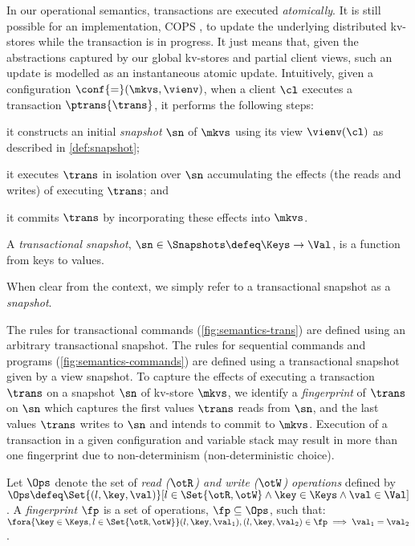 In our operational semantics, transactions are executed
\emph{atomically}. It is still possible for an
implementation, \eg COPS \cite{cops}, 
to update the underlying distributed kv-stores while
the transaction is in progress. It just means that, given the
abstractions captured by our global kv-stores and partial client views, 
such an update is modelled as an instantaneous  atomic
update.
Intuitively, given a configuration \(\conf {=} (\mkvs, \vienv)\), 
when a client \(\cl\) executes a transaction \(\ptrans{\trans}\), 
it performs the following steps: 
\begin{enumerate*}
	\item it constructs an initial \emph{snapshot} \(\sn\) of \(\mkvs\) using its view \(\vienv(\cl)\) as described in \cref{def:snapshot};  
	\item it executes \(\trans\) in isolation over \(\sn\) accumulating the effects (the reads and writes) of executing \(\trans\); and
	\item it commits \(\trans\) by incorporating these effects into \(\mkvs\).
\end{enumerate*}

\SpaceAboveDef
\begin{definition}
\label{def:heaps}
A \emph{transactional snapshot}, \( \sn \in \Snapshots \defeq \Keys \to
\Val\),  is a function from keys to values. 
\end{definition}
\SpaceBelowDef
When clear from the context, we simply refer to a transactional
snapshot  as a {\em snapshot}. 

The rules for transactional commands (\cref{fig:semantics-trans}) are defined using an arbitrary 
transactional snapshot. 
The rules for sequential commands and programs (\cref{fig:semantics-commands}) are defined using a transactional
snapshot given by a view snapshot. 
To capture the effects of executing a transaction \(\trans\) on a snapshot \(\sn\) of kv-store \(\mkvs\), 
we identify a \emph{fingerprint} of \(\trans\) on \(\sn\) which
captures the first values \(\trans\) reads from \(\sn\), and
the last values \(\trans\) writes to \(\sn\) and intends to commit to \(\mkvs\). 
Execution of a transaction in a given configuration  and variable
stack may result in more than one fingerprint due to non-determinism (non-deterministic choice). 

\SpaceAboveDef
\begin{definition}[Fingerprints]
\label{beebop}
\label{def:fingerprint}
Let \( \Ops\) denote the set of \emph{read (\( \otR\)) and write (\(\otW\)) operations} defined by 
\(\Ops \defeq \Set{(l, \key, \val) }[ l \in \Set{\otR, \otW} \land \key \in \Keys \land \val \in \Val ]\).
A \emph{fingerprint} \(\fp\) is a set of operations, \(\fp \subseteq \Ops\),
such that: 
\(\fora{\key \in \Keys, l  \in \Set{\otR, \otW}}
	(l, \key, \val_1), (l, \key, \val_2) \in \fp \implies \val_1 = \val_2\).
\end{definition}
\SpaceBelowDef

